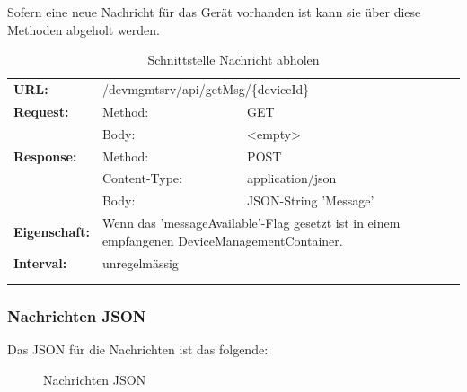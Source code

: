Sofern eine neue Nachricht für das Gerät vorhanden ist kann sie über diese Methoden abgeholt werden.

{\renewcommand{\arraystretch}{1}
    \begin{longtable}{ p{2.5cm} p{3.5cm} p{6cm}}

	\textbf{URL:} & \multicolumn{2}{p{10cm}}{/devmgmtsrv/api/getMsg/\{deviceId\}} \\
	\textbf{Request:} & Method: & GET \\
		& Body: & <empty> \\
	\textbf{Response:} & Method: & POST \\
		& Content-Type: & application/json \\
		& Body: & JSON-String 'Message' \\
	\textbf{Eigenschaft:} & \multicolumn{2}{p{10cm}}{ Wenn das 'messageAvailable'-Flag gesetzt ist in einem empfangenen DeviceManagementContainer.} \\
	\textbf{Interval:} & \multicolumn{2}{p{10cm}}{unregelmässig}\\
\\
\caption{Schnittstelle Nachricht abholen}
\end{longtable} }

\subsubsection{Nachrichten JSON}
Das JSON für die Nachrichten ist das folgende:
\begin{figure}[H]
	\centering
	
	\caption{Nachrichten JSON}
\end{figure}


